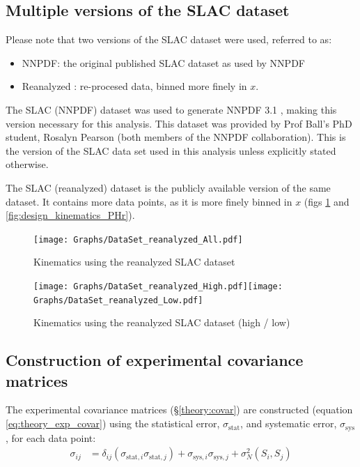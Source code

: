 \documentclass[12pt,a4paper]{report}
\newcommand*{\lr}[1]{\left( {#1} \right)}
\begin{document}
\subsection{Multiple versions of the SLAC dataset} \label{sec:SLAC_reanalyzed}

Please note that two versions of the SLAC dataset were used, referred to as:
\begin{itemize}
\item NNPDF: the original published SLAC dataset as used by NNPDF\\
\item Reanalyzed \cite{Whitlow}: re-procesed data, binned more finely in $x$.
\end{itemize}

The SLAC (NNPDF) dataset was used to generate NNPDF 3.1 \cite{NNPDF31}, making this version necessary for this analysis. This dataset was provided by Prof Ball's PhD student, \mbox{Rosalyn} \mbox{Pearson} (both members of the NNPDF collaboration). This is the version of the SLAC data set used in this analysis unless explicitly stated otherwise.

The SLAC (reanalyzed) dataset is the publicly available version of the same dataset. It contains more data points, as it is more finely binned in $x$ (figs \ref{fig:design_kinematics_PAr} and \ref{fig:design_kinematics_PHr}).
\begin{figure}[h]
\begin{center}
\texttt{[image: Graphs/DataSet\_reanalyzed\_All.pdf]}
\caption{Kinematics using the reanalyzed SLAC dataset}
\label{fig:design_kinematics_PAr}
\end{center}
\end{figure}

\begin{figure}[h]
\begin{center}
\texttt{[image: Graphs/DataSet\_reanalyzed\_High.pdf]}\texttt{[image: Graphs/DataSet\_reanalyzed\_Low.pdf]}
\caption{Kinematics using the reanalyzed SLAC dataset (high / low)}
\label{fig:design_kinematics_PHr} \label{fig:design_kinematics_PLr}
\end{center}
\end{figure}

\subsection{Construction of experimental covariance matrices} \label{sec:design_normalisation}

The experimental covariance matrices (\S \ref{theory:covar}) are constructed (equation \ref{eq:theory_exp_covar}) using the statistical error, $\sigma_{\textrm{stat}}$, and systematic error, $\sigma_{\textrm{sys}}$, for each data point:
\begin{align}
 \sigma_{ij} &= \delta_{ij} \lr{\sigma_{\textrm{stat},i} \sigma_{\textrm{stat},j}}
+ \sigma_{\textrm{sys},i} \sigma_{\textrm{sys},j}
+ \sigma_N^2 \lr{S_i, S_j}
\end{align}
\end{document}
